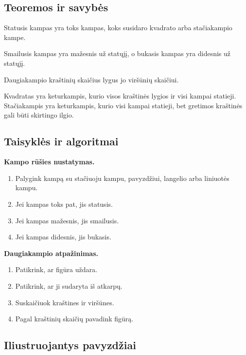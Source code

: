 \subsection{Teoremos ir savybės}

\begin{savybe}
Statusis kampas yra toks kampas, koks susidaro kvadrato arba stačiakampio kampe.
\end{savybe}

\begin{savybe}
Smailusis kampas yra mažesnis už statųjį, o bukasis kampas yra didesnis už statųjį.
\end{savybe}

\begin{savybe}
Daugiakampio kraštinių skaičius lygus jo viršūnių skaičiui.
\end{savybe}

\begin{savybe}
Kvadratas yra keturkampis, kurio visos kraštinės lygios ir visi kampai statieji. Stačiakampis yra keturkampis, kurio visi kampai statieji, bet gretimos kraštinės gali būti skirtingo ilgio.
\end{savybe}

\subsection{Taisyklės ir algoritmai}

\textbf{Kampo rūšies nustatymas.}
\begin{enumerate}[label=\arabic*.]
\item Palygink kampą su stačiuoju kampu, pavyzdžiui, langelio arba liniuotės kampu.
\item Jei kampas toks pat, jis statusis.
\item Jei kampas mažesnis, jis smailusis.
\item Jei kampas didesnis, jis bukasis.
\end{enumerate}

\textbf{Daugiakampio atpažinimas.}
\begin{enumerate}[label=\arabic*.]
\item Patikrink, ar figūra uždara.
\item Patikrink, ar ji sudaryta iš atkarpų.
\item Suskaičiuok kraštines ir viršūnes.
\item Pagal kraštinių skaičių pavadink figūrą.
\end{enumerate}

\subsection{Iliustruojantys pavyzdžiai}

